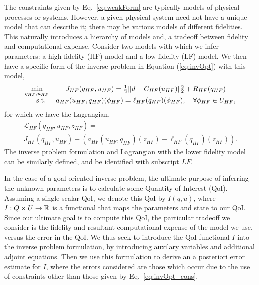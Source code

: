 The constraints given by Eq.~\eqref{eq:weakForm} are typically models of physical processes or systems. However, a given physical system need not have a unique model that can describe it; there may be various models of different fidelities. This naturally introduces a hierarchy of models and, a tradeoff between fidelity and computational expense. Consider two models with which we infer parameters: a high-fidelity (HF) model and a low fidelity (LF) model. We then have a specific form of the inverse problem in Equation (\ref{eq:invOpt}) with this model,
\begin{equation}
\begin{array}{r@{}c}
\min\limits_{q_{HF},u_{HF}} & \quad J_{HF}(q_{HF},u_{HF})=\frac{1}{2}\|d-C_{HF}(u_{HF})\|_2^2 + R_{HF}(q_{HF}) \\ \textrm{s.t. }& \quad a_{HF}(u_{HF},q_{HF})(\phi_{HF})=\ell_{HF}(q_{HF})(\phi_{HF}),\quad\forall\phi_{HF}\in U_{HF},
\end{array}
\end{equation}
for which we have the Lagrangian,
\begin{multline}
\mathcal{L}_{HF}(q_{HF},u_{HF},z_{HF}) = \\
J_{HF}(q_{HF},u_{HF})-(a_{HF}(u_{HF},q_{HF})(z_{HF})-\ell_{HF}(q_{HF})(z_{HF})).
\end{multline}
The inverse problem formulation and Lagrangian with the lower fidelity model can be similarly defined, and be identified with subscript $LF$.

In the case of a goal-oriented inverse problem, the ultimate purpose of inferring the unknown parameters is to calculate some Quantity of Interest (QoI). Assuming a single scalar QoI, we denote this QoI by $I(q,u)$, where $I:Q\times U\to{\mathbb{R}}$ is a functional that maps the parameters and state to our QoI. Since our ultimate goal is to compute this QoI, the particular tradeoff we consider is the fidelity and resultant computational expense of the model we use, versus the error in the QoI. We thus seek to introduce the QoI functional $I$ into the inverse problem formulation, by introducing auxilary variables and additional adjoint equations. Then we use this formulation to derive an a posteriori error estimate for $I$, where the errors considered are those which occur due to the use of constraints other than those given by Eq.~\eqref{eq:invOpt_cons}.
%

